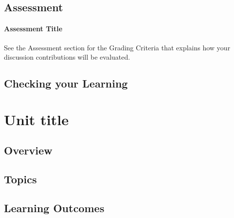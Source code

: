 \documentclass[
]{book}
\begin{document}
\hypertarget{assessment-4}{%
\section*{Assessment}\label{assessment-4}}

\begin{assessment}
\hypertarget{assessment-title}{%
\subsubsection*{Assessment Title}\label{assessment-title}}

See the Assessment section for the Grading Criteria that explains how
your discussion contributions will be evaluated.
\end{assessment}

\hypertarget{checking-your-learning-4}{%
\section*{Checking your Learning}\label{checking-your-learning-4}}

\begin{progress}

\end{progress}

\hypertarget{unit-title-5}{%
\chapter{Unit title}\label{unit-title-5}}

\hypertarget{overview-5}{%
\section*{Overview}\label{overview-5}}

\hypertarget{topics-5}{%
\section*{Topics}\label{topics-5}}

\hypertarget{learning-outcomes-5}{%
\section*{Learning Outcomes}\label{learning-outcomes-5}}
\end{document}

